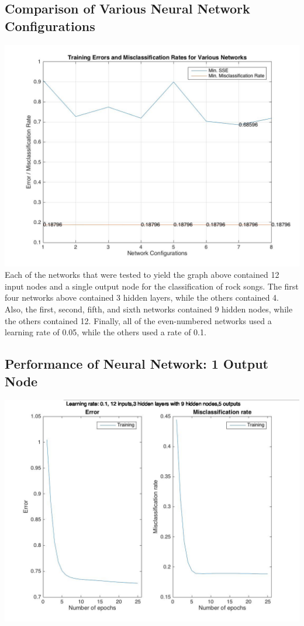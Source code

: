 \documentclass[12pt]{article}
\begin{document}
\subsection{Comparison of Various Neural Network Configurations}
\label{subsec:variousANN}
\includegraphics[scale=0.3]{images/ann/graphOfVariousNetworksWith1Genre}
\\
Each of the networks that were tested to yield the graph above contained 12 input nodes and a single output node for the classification of rock songs. The first four networks above contained 3 hidden layers, while the others contained 4. Also, the first, second, fifth, and sixth networks contained 9 hidden nodes, while the others contained 12. Finally, all of the even-numbered networks used a learning rate of 0.05, while the others used a rate of 0.1.
\subsection{Performance of Neural Network: 1 Output Node}
\label{subsec:annBestPerformance}
\includegraphics[scale=0.3]{images/ann/bestRun}
\end{document}

